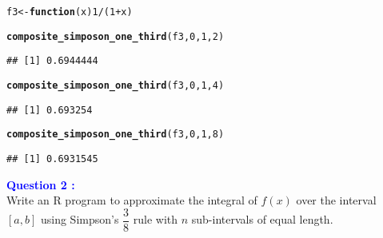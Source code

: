 \documentclass[11pt, a4paper]{article}\usepackage[]{graphicx}\usepackage[]{xcolor}
\makeatletter
\newcommand{\hlnum}[1]{\textcolor[rgb]{0.686,0.059,0.569}{#1}}%
\newcommand{\hlopt}[1]{\textcolor[rgb]{0,0,0}{#1}}%
\newcommand{\hldef}[1]{\textcolor[rgb]{0.345,0.345,0.345}{#1}}%
\newcommand{\hlkwa}[1]{\textcolor[rgb]{0.161,0.373,0.58}{\textbf{#1}}}%
\newcommand{\hlkwb}[1]{\textcolor[rgb]{0.69,0.353,0.396}{#1}}%
\newcommand{\hlkwc}[1]{\textcolor[rgb]{0.333,0.667,0.333}{#1}}%
\newcommand{\hlkwd}[1]{\textcolor[rgb]{0.737,0.353,0.396}{\textbf{#1}}}%
\newenvironment{kframe}{%
 \def\at@end@of@kframe{}%
 \ifinner\ifhmode%
  \def\at@end@of@kframe{\end{minipage}}%
  \begin{minipage}{\columnwidth}%
 \fi\fi%
 \def\FrameCommand##1{\hskip\@totalleftmargin \hskip-\fboxsep
 \colorbox{shadecolor}{##1}\hskip-\fboxsep
     \hskip-\linewidth \hskip-\@totalleftmargin \hskip\columnwidth}%
 \MakeFramed {\advance\hsize-\width
   \@totalleftmargin\z@ \linewidth\hsize
   \@setminipage}}%
 {\par\unskip\endMakeFramed%
 \at@end@of@kframe}
\newenvironment{knitrout}{}{} %
\makeatother
\begin{document}
\begin{knitrout}
\color{fgcolor}\begin{kframe}
\begin{alltt}
\hldef{f3} \hlkwb{<-} \hlkwa{function}\hldef{(}\hlkwc{x}\hldef{)} \hlnum{1} \hlopt{/} \hldef{(}\hlnum{1} \hlopt{+} \hldef{x)}

\hlkwd{composite_simposon_one_third}\hldef{(f3,} \hlnum{0}\hldef{,} \hlnum{1}\hldef{,} \hlnum{2}\hldef{)}
\end{alltt}
\begin{verbatim}
## [1] 0.6944444
\end{verbatim}
\end{kframe}
\end{knitrout}

\begin{knitrout}
\color{fgcolor}\begin{kframe}
\begin{alltt}
\hlkwd{composite_simposon_one_third}\hldef{(f3,} \hlnum{0}\hldef{,} \hlnum{1}\hldef{,} \hlnum{4}\hldef{)}
\end{alltt}
\begin{verbatim}
## [1] 0.693254
\end{verbatim}
\end{kframe}
\end{knitrout}

\begin{knitrout}
\color{fgcolor}\begin{kframe}
\begin{alltt}
\hlkwd{composite_simposon_one_third}\hldef{(f3,} \hlnum{0}\hldef{,} \hlnum{1}\hldef{,} \hlnum{8}\hldef{)}
\end{alltt}
\begin{verbatim}
## [1] 0.6931545
\end{verbatim}
\end{kframe}
\end{knitrout}

\smallpencil \hspace{0.2cm} \textcolor{blue}{\textbf{Question 2 : }} \\

\hspace{1cm} Write an R program to approximate the integral of $f(x)$ over the interval $[a, b]$ using Simpson's $\dfrac{3}{8}$ rule with $n$ sub-intervals of equal length.
\end{document}
